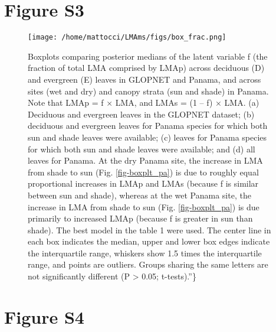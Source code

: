 \documentclass[
  12pt,
  letterpaper,
  DIV=11,
  numbers=noendperiod]{scrartcl}
\begin{document}
\newpage

\hypertarget{figure-s3}{%
\section{Figure S3}\label{figure-s3}}

\begin{figure}

{\centering \texttt{[image: /home/mattocci/LMAms/figs/box\_frac.png]}

}

\caption{\label{fig-box_frac}Boxplots comparing posterior medians of the
latent variable f (the fraction of total LMA comprised by LMAp) across
deciduous (D) and evergreen (E) leaves in GLOPNET and Panama, and across
sites (wet and dry) and canopy strata (sun and shade) in Panama. Note
that LMAp = f × LMA, and LMAs = (1 -- f) × LMA. (a) Deciduous and
evergreen leaves in the GLOPNET dataset; (b) deciduous and evergreen
leaves for Panama species for which both sun and shade leaves were
available; (c) leaves for Panama species for which both sun and shade
leaves were available; and (d) all leaves for Panama. At the dry Panama
site, the increase in LMA from shade to sun (Fig. \ref{fig-boxplt_pa})
is due to roughly equal proportional increases in LMAp and LMAs (because
f is similar between sun and shade), whereas at the wet Panama site, the
increase in LMA from shade to sun (Fig. \ref{fig-boxplt_pa}) is due
primarily to increased LMAp (because f is greater in sun than shade).
The best model in the table 1 were used. The center line in each box
indicates the median, upper and lower box edges indicate the
interquartile range, whiskers show 1.5 times the interquartile range,
and points are outliers. Groups sharing the same letters are not
significantly different (P \textgreater{} 0.05; t-tests).''\}}

\end{figure}

\newpage

\hypertarget{figure-s4}{%
\section{Figure S4}\label{figure-s4}}
\end{document}
